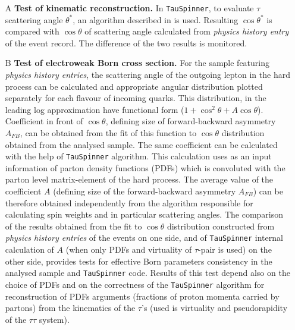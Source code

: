 \documentclass{article}
\begin{document}
\begin{enumerate}
\item[A] {\bf Test of kinematic reconstruction.}
In  {\tt TauSpinner}, to evaluate $\tau$ scattering angle $\theta^*$, an algorithm described 
in \cite{Was:1989ce} is used. Resulting  $\cos \theta^*$ is compared with $\cos \theta$
of scattering angle calculated from {\it physics history entry} of the  event record. 
The difference of the two results is monitored.
\item[B] {\bf Test of electroweak Born cross section.}
For the sample featuring {\it physics history entries}, the scattering angle of the outgoing lepton in the hard process 
can be calculated and appropriate angular distribution
plotted separately for each flavour of incoming quarks. 
This distribution, in the leading log approximation have functional form
 ($1+\cos^2 \theta + A \cos \theta$). 
Coefficient in front  of  $\cos \theta$, defining size of forward-backward asymmetry $A_{FB}$, 
can be obtained from the fit of this function to $\cos \theta$ distribution obtained 
from the analysed sample. The same coefficient can be calculated with the help of 
{\tt TauSpinner} algorithm. This calculation uses as an input information of parton density functions (PDFs)
which is convoluted with the parton level matrix-element of the hard process. 
The average value of the coefficient $A$ (defining size of the forward-backward asymmetry $A_{FB}$) can be therefore obtained independently
from the algorithm responsible for calculating spin weights and in particular  scattering angles.
The comparison of the results obtained from the fit to $\cos \theta$
distribution constructed from {\it physics history entries} of the events on one side,
 and of {\tt TauSpinner} internal calculation of $A$ 
(when only PDFs and virtuality of $\tau$-pair is used) on the other side,
provides tests for effective Born parameters consistency in the analysed sample and {\tt TauSpinner} code. Results 
of this test depend also on the choice of PDFs and on the correctness of the {\tt TauSpinner} algorithm 
for reconstruction of PDFs arguments (fractions of proton momenta carried by partons)  from the kinematics of the $\tau$'s 
(used is virtuality  and pseudorapidity  of the $\tau \tau$ system). 


\end{enumerate}
\end{document}

